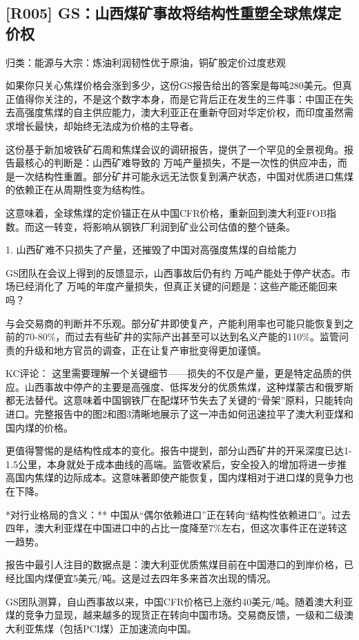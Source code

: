 \documentclass[11pt]{ctexart}
\begin{document}
\subsection{[R005] GS：山西煤矿事故将结构性重塑全球焦煤定价权}
{\small\color{refgray}归类：能源与大宗：炼油利润韧性优于原油，铜矿股定价过度悲观}

如果你只关心焦煤价格会涨到多少，这份GS报告给出的答案是每吨280美元。但真正值得你关注的，不是这个数字本身，而是它背后正在发生的三件事：中国正在失去高强度焦煤的自主供应能力，澳大利亚正在重新夺回对华定价权，而印度虽然需求增长最快，却始终无法成为价格的主导者。

这份基于新加坡铁矿石周和焦煤会议的调研报告，提供了一个罕见的全景视角。报告最核心的判断是：山西矿难导致的 万吨产量损失，不是一次性的供应冲击，而是一次结构性重置。部分矿井可能永远无法恢复到满产状态，中国对优质进口焦煤的依赖正在从周期性变为结构性。

这意味着，全球焦煤的定价锚正在从中国CFR价格，重新回到澳大利亚FOB指数。而这一转变，将影响从钢铁厂利润到矿业公司估值的整个链条。

1. 山西矿难不只损失了产量，还摧毁了中国对高强度焦煤的自给能力

GS团队在会议上得到的反馈显示，山西事故后仍有约 万吨产能处于停产状态。市场已经消化了 万吨的年度产量损失，但真正关键的问题是：这些产能还能回来吗？

与会交易商的判断并不乐观。部分矿井即使复产，产能利用率也可能只能恢复到之前的70-80\%，而过去有些矿井的实际产出甚至可以达到名义产能的110\%。监管问责的升级和地方官员的调查，正在让复产审批变得更加谨慎。

KC评论： 这里需要理解一个关键细节——损失的不仅是产量，更是特定品质的供应。山西事故中停产的主要是高强度、低挥发分的优质焦煤，这种煤蒙古和俄罗斯都无法替代。这意味着中国钢铁厂在配煤环节失去了关键的“骨架”原料，只能转向进口。完整报告中的图2和图3清晰地展示了这一冲击如何迅速拉平了澳大利亚煤和国内煤的价格。

更值得警惕的是结构性成本的变化。报告中提到，部分山西矿井的开采深度已达1-1.5公里，本身就处于成本曲线的高端。监管收紧后，安全投入的增加将进一步推高国内焦煤的边际成本。这意味著即使产能恢复，国内煤相对于进口煤的竞争力也在下降。

*对行业格局的含义：** 中国从“偶尔依赖进口”正在转向“结构性依赖进口”。过去四年，澳大利亚煤在中国进口中的占比一度降至7\%左右，但这次事件正在逆转这一趋势。

报告中最引人注目的数据点是：澳大利亚优质焦煤目前在中国港口的到岸价格，已经比国内煤便宜5美元/吨。这是过去四年多来首次出现的情况。

GS团队测算，自山西事故以来，中国CFR价格已上涨约40美元/吨。随着澳大利亚煤的竞争力显现，越来越多的现货正在转向中国市场。交易商反馈，一级和二级澳大利亚焦煤（包括PCI煤）正加速流向中国。
\end{document}
